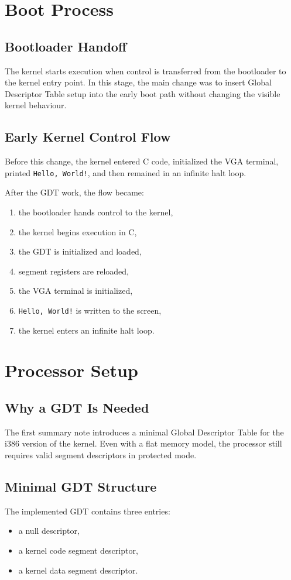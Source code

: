 \section{Boot Process}

\subsection{Bootloader Handoff}
The kernel starts execution when control is transferred from the bootloader to the kernel entry point. In this stage, the main change was to insert Global Descriptor Table setup into the early boot path without changing the visible kernel behaviour.

\subsection{Early Kernel Control Flow}
Before this change, the kernel entered C code, initialized the VGA terminal, printed \texttt{Hello, World!}, and then remained in an infinite halt loop.

After the GDT work, the flow became:
\begin{enumerate}
  \item the bootloader hands control to the kernel,
  \item the kernel begins execution in C,
  \item the GDT is initialized and loaded,
  \item segment registers are reloaded,
  \item the VGA terminal is initialized,
  \item \texttt{Hello, World!} is written to the screen,
  \item the kernel enters an infinite halt loop.
\end{enumerate}

\section{Processor Setup}

\subsection{Why a GDT Is Needed}
The first summary note introduces a minimal Global Descriptor Table for the i386 version of the kernel. Even with a flat memory model, the processor still requires valid segment descriptors in protected mode.

\subsection{Minimal GDT Structure}
The implemented GDT contains three entries:
\begin{itemize}
  \item a null descriptor,
  \item a kernel code segment descriptor,
  \item a kernel data segment descriptor.
\end{itemize}

